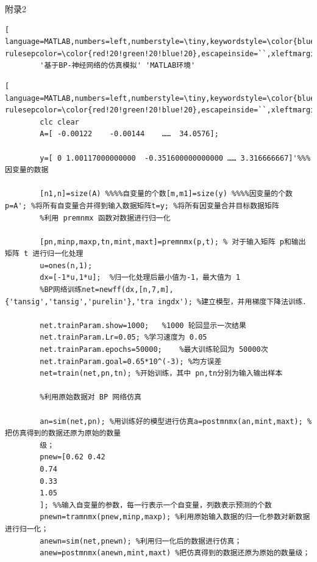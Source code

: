 \documentclass[UTF8]{ctexart}
\begin{document}
\begin{center}
	\sihao \heiti 附录2
	\fontsize{10pt}{16pt}		\selectfont	
	\begin{lstlisting}[ language=MATLAB,numbers=left,numberstyle=\tiny,keywordstyle=\color{blue!70},commentstyle=\color{red!50!green!50!blue!50},frame=shadowbox, rulesepcolor=\color{red!20!green!20!blue!20},escapeinside=``,xleftmargin=2em,xrightmargin=2em,aboveskip=1em] 
		'基于BP-神经网络的仿真模拟' 'MATLAB环境'	
	\end{lstlisting}		
	\begin{lstlisting}[ language=MATLAB,numbers=left,numberstyle=\tiny,keywordstyle=\color{blue!70},commentstyle=\color{red!50!green!50!blue!50},frame=shadowbox, rulesepcolor=\color{red!20!green!20!blue!20},escapeinside=``,xleftmargin=2em,xrightmargin=2em,aboveskip=1em] 
		clc clear
		A=[ -0.00122	-0.00144	……	34.0576];
		
		y=[ 0 1.00117000000000	-0.351600000000000 …… 3.316666667]'%%%因变量的数据
		
		[n1,n]=size(A) %%%%自变量的个数[m,m1]=size(y) %%%%因变量的个数p=A'; %将所有自变量合并得到输入数据矩阵t=y; %将所有因变量合并目标数据矩阵
		%利用 premnmx 函数对数据进行归一化
		
		[pn,minp,maxp,tn,mint,maxt]=premnmx(p,t); % 对于输入矩阵 p和输出矩阵 t 进行归一化处理
		u=ones(n,1);
		dx=[-1*u,1*u];	%归一化处理后最小值为-1，最大值为 1
		%BP网络训练net=newff(dx,[n,7,m],{'tansig','tansig','purelin'},'tra ingdx'); %建立模型，并用梯度下降法训练．
		
		net.trainParam.show=1000;	%1000 轮回显示一次结果
		net.trainParam.Lr=0.05;	%学习速度为 0.05
		net.trainParam.epochs=50000;	%最大训练轮回为 50000次
		net.trainParam.goal=0.65*10^(-3); %均方误差
		net=train(net,pn,tn); %开始训练，其中 pn,tn分别为输入输出样本
		
		%利用原始数据对 BP 网络仿真
		
		an=sim(net,pn);	%用训练好的模型进行仿真a=postmnmx(an,mint,maxt); % 把仿真得到的数据还原为原始的数量
		级；
		pnew=[0.62 0.42
		0.74
		0.33
		1.05
		]; %%输入自变量的参数，每一行表示一个自变量，列数表示预测的个数
		pnewn=tramnmx(pnew,minp,maxp); %利用原始输入数据的归一化参数对新数据进行归一化；
		anewn=sim(net,pnewn); %利用归一化后的数据进行仿真；
		anew=postmnmx(anewn,mint,maxt) %把仿真得到的数据还原为原始的数量级；
	\end{lstlisting}
\end{center}
\end{document}
